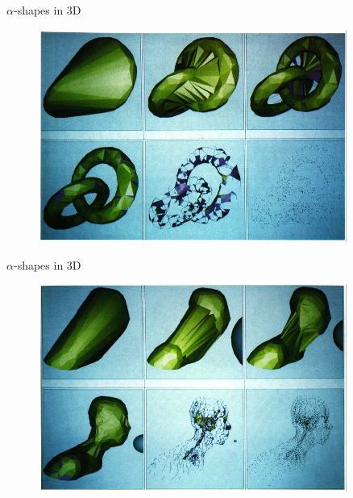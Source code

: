 \begin{frame}{$\alpha$-shapes in 3D}
        \begin{figure}
            \centering
            \includegraphics[width=0.9\textwidth]{figs/L19-alpha-shapes-3D-1.jpg}
        \end{figure}
\end{frame}

\begin{frame}{$\alpha$-shapes in 3D}
        \begin{figure}
            \centering
            \includegraphics[width=0.9\textwidth]{figs/L19-alpha-shapes-3D-2.jpg}
        \end{figure}
\end{frame}

